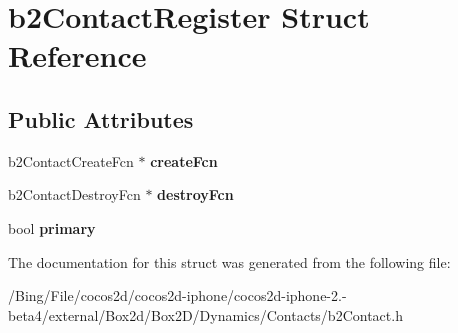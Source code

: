 \hypertarget{structb2_contact_register}{\section{b2\-Contact\-Register Struct Reference}
\label{structb2_contact_register}
}
\subsection*{Public Attributes}
\begin{DoxyCompactItemize}
\item 
\hypertarget{structb2_contact_register_ae065de11ab2f164bd1b8e3a461b41824}{b2\-Contact\-Create\-Fcn $\ast$ {\bfseries create\-Fcn}}\label{structb2_contact_register_ae065de11ab2f164bd1b8e3a461b41824}

\item 
\hypertarget{structb2_contact_register_a95862aec746f5fd6ffa00a6729dec61f}{b2\-Contact\-Destroy\-Fcn $\ast$ {\bfseries destroy\-Fcn}}\label{structb2_contact_register_a95862aec746f5fd6ffa00a6729dec61f}

\item 
\hypertarget{structb2_contact_register_a43f2d79909505b785b9034b21a56525e}{bool {\bfseries primary}}\label{structb2_contact_register_a43f2d79909505b785b9034b21a56525e}

\end{DoxyCompactItemize}


The documentation for this struct was generated from the following file\-:\begin{DoxyCompactItemize}
\item 
/\-Bing/\-File/cocos2d/cocos2d-\/iphone/cocos2d-\/iphone-\/2.-\/beta4/external/\-Box2d/\-Box2\-D/\-Dynamics/\-Contacts/b2\-Contact.\-h\end{DoxyCompactItemize}
